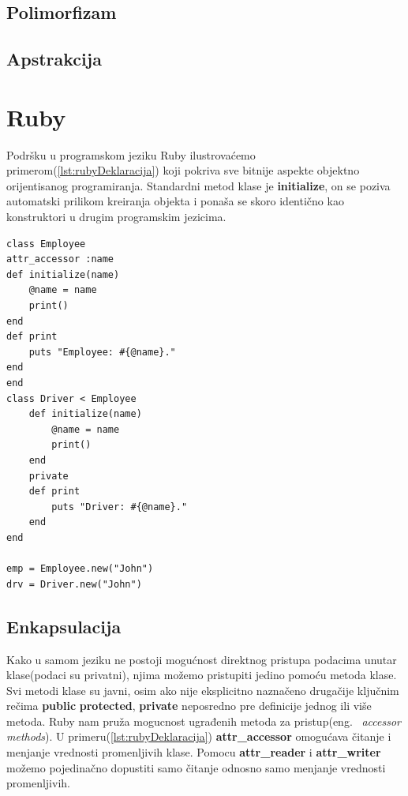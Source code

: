 \documentclass[a4paper]{article}
\begin{document}
\subsection{Polimorfizam}
\label{subsec:adaPolimorfizam}

\subsection{Apstrakcija}
\label{subsec:adaApstrakcija}

\section{Ruby}
\label{sec:ruby}
 Podršku u programskom jeziku Ruby ilustrovaćemo primerom(\ref{lst:rubyDeklaracija}) koji pokriva sve bitnije aspekte objektno orijentisanog programiranja. Standardni metod klase je \textbf{initialize}, on se poziva automatski prilikom kreiranja objekta i ponaša se skoro identično kao konstruktori u drugim programskim jezicima.

\begin{lstlisting}[caption={Primer objektno orijentisanog programiranja u jeziku Ruby.},frame=single, label=lst:rubyDeklaracija]
class Employee
attr_accessor :name
def initialize(name)
	@name = name
	print()
end
def print
	puts "Employee: #{@name}."
end
end
class Driver < Employee
	def initialize(name)
		@name = name
		print()
	end
	private
	def print
		puts "Driver: #{@name}."
	end
end

emp = Employee.new("John")
drv = Driver.new("John")
\end{lstlisting}

\subsection{Enkapsulacija}
\label{subsec:rubyEnkapsulacija}
Kako u samom jeziku ne postoji mogućnost direktnog pristupa podacima unutar klase(podaci su privatni), njima možemo pristupiti jedino pomoću metoda klase. Svi metodi klase su javni, osim ako nije eksplicitno naznačeno drugačije ključnim rečima \textbf{public} \textbf{protected}, \textbf{private} neposredno pre definicije jednog ili više metoda. Ruby nam pruža mogucnost ugrađenih metoda za pristup(eng. ~{\em accessor methods}). U primeru(\ref{lst:rubyDeklaracija})  \textbf{attr\_accessor} omogućava čitanje i menjanje vrednosti promenljivih klase. Pomocu \textbf{attr\_reader} i \textbf{attr\_writer} možemo pojedinačno dopustiti samo čitanje odnosno samo menjanje vrednosti promenljivih.
\end{document}
